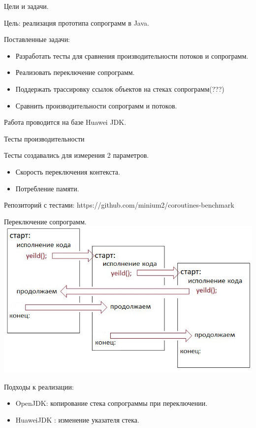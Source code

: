 \begin{frame}{Цели и задачи.}
	
	Цель: реализация прототипа сопрограмм в Java.
	\par
	Поставленные задачи:
	\begin{itemize}
		\item Разработать тесты для сравнения производительности потоков и сопрограмм.
		\item Реализовать переключение сопрограмм.
		\item Поддержать трассировку ссылок объектов на стеках сопрограмм(???)
		\item Сравнить производительности сопрограмм и потоков.
	\end{itemize}

	Работа проводится на базе Huawei JDK.
\end{frame}

\begin{frame}{Тесты производительности}
	
	Тесты создавались для измерения 2 параметров.
	\begin{itemize}
		\item Скорость переключения контекста.
		\item Потребление памяти.
	\end{itemize}
	Репозиторий с тестами: https://github.com/minium2/coroutines-benchmark
	
\end{frame}

\begin{frame}{Переключение сопрограмм.}
	\includegraphics[scale=0.5]{images/scheme.jpg}
	\par
	Подходы к реализации:
	\begin{itemize}
		\item OpenJDK: копирование стека сопрограммы при переключении.
		\item HuaweiJDK : изменение указателя стека.
	\end{itemize}
\end{frame}

